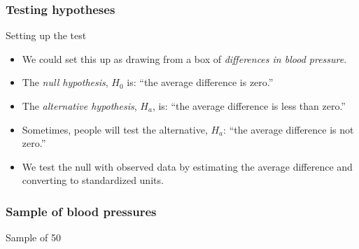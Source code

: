 \documentclass[handout]{beamer}
\begin{document}

   \begin{frame} \frametitle{Testing hypotheses}

   \begin{block}
   {Setting up the test}
   \begin{itemize}

   \item We could set this up as drawing from a box of {\em differences
   in blood pressure}.

   \item The {\em null hypothesis}, $H_0$ is: ``the average difference is zero.''

   \item The {\em alternative hypothesis}, $H_a$, is: ``the average difference is less than zero.''

   \item Sometimes, people will test the alternative, $H_a$: ``the
   average difference is not zero.''

   \item We test the null with observed data by estimating
    the average difference and converting to standardized units.
   \end{itemize}
   \end{block}
   \end{frame}



   \begin{frame}
   \frametitle{Sample of blood pressures}
   \begin{center}
   \end{center}
   Sample of 50
   \end{frame}
\end{document}
